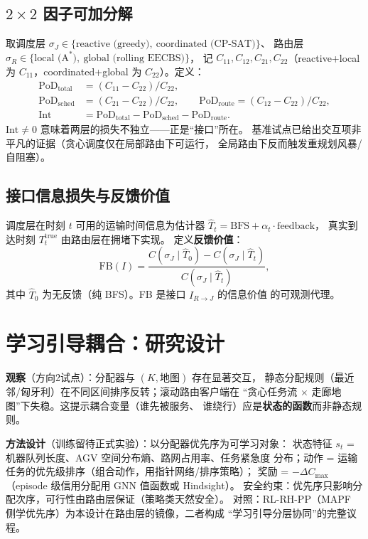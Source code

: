 \documentclass[UTF8,12pt,a4paper]{ctexart}
\newcommand{\Cmax}{C_{\max}}
\begin{document}
\subsection{$2\times2$ 因子可加分解}

取调度层 $\sigma_J\in\{\text{reactive (greedy)},\ \text{coordinated (CP-SAT)}\}$、
路由层 $\sigma_R\in\{\text{local (A}^*\text{)},\ \text{global (rolling EECBS)}\}$，
记 $C_{11},C_{12},C_{21},C_{22}$（reactive+local 为 $C_{11}$，coordinated+global
为 $C_{22}$）。定义：
\begin{align}
\mathrm{PoD}_{\mathrm{total}} &= (C_{11}-C_{22})/C_{22}, \\
\mathrm{PoD}_{\mathrm{sched}} &= (C_{21}-C_{22})/C_{22}, \qquad
\mathrm{PoD}_{\mathrm{route}} = (C_{12}-C_{22})/C_{22}, \\
\mathrm{Int} &= \mathrm{PoD}_{\mathrm{total}}
- \mathrm{PoD}_{\mathrm{sched}} - \mathrm{PoD}_{\mathrm{route}}.
\end{align}
$\mathrm{Int}\ne 0$ 意味着两层的损失不独立——正是``接口''所在。
基准试点已给出交互项非平凡的证据（贪心调度仅在局部路由下可运行，
全局路由下反而触发重规划风暴/自阻塞）。

\subsection{接口信息损失与反馈价值}

调度层在时刻 $t$ 可用的运输时间信息为估计器
$\hat{T}_t = \mathrm{BFS} + \alpha_t\cdot\mathrm{feedback}$，
真实到达时刻 $T^{\mathrm{true}}_t$ 由路由层在拥堵下实现。
定义\textbf{反馈价值}：
\begin{equation}
\mathrm{FB}(I) = \frac{C(\sigma_J \mid \hat{T}_0) - C(\sigma_J\mid \hat{T}_t)}
{C(\sigma_J\mid \hat{T}_t)},
\end{equation}
其中 $\hat{T}_0$ 为无反馈（纯 BFS）。FB 是接口 $I_{R\to J}$ 的信息价值
的可观测代理。

\section{学习引导耦合：研究设计}\label{sec:learn}

\textbf{观察}（方向2试点）：分配器与 $(K,\text{地图})$ 存在显著交互，
静态分配规则（最近邻/匈牙利）在不同区间排序反转；滚动路由客户端在
``贪心任务流 $\times$ 走廊地图''下失稳。这提示耦合变量（谁先被服务、
谁绕行）应是\textbf{状态的函数}而非静态规则。

\textbf{方法设计}（训练留待正式实验）：以分配器优先序为可学习对象：
状态特征 $s_t$ = 机器队列长度、AGV 空间分布熵、路网占用率、任务紧急度
分布；动作 = 运输任务的优先级排序（组合动作，用指针网络/排序策略）；
奖励 = $-\Delta\Cmax$（episode 级信用分配用 GNN 值函数或 Hindsight）。
安全约束：优先序只影响分配次序，可行性由路由层保证（策略类天然安全）。
对照：RL-RH-PP（MAPF 侧学优先序）为本设计在路由层的镜像，二者构成
``学习引导分层协同''的完整议程。
\end{document}
